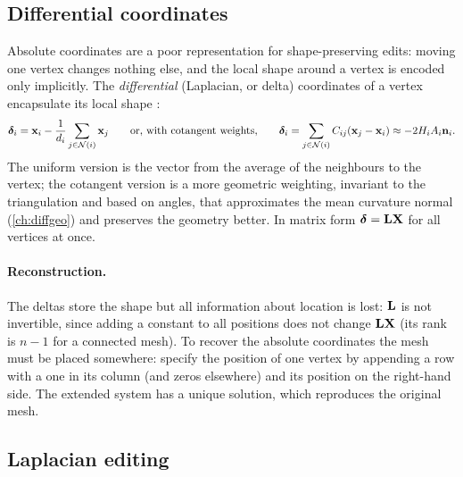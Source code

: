 \subsection{Differential coordinates}

Absolute coordinates are a poor representation for shape-preserving edits: moving one vertex
changes nothing else, and the local shape around a vertex is encoded only implicitly. The
\emph{differential} (Laplacian, or delta) coordinates of a vertex encapsulate its local shape
\citep{Sorkine2006}:
\begin{equation}
\boldsymbol{\delta}_i=\mathbf{x}_i-\frac{1}{d_i}\sum_{j\in\mathcal N(i)}\mathbf{x}_j
\qquad\text{or, with cotangent weights,}\qquad
\boldsymbol{\delta}_i=\sum_{j\in\mathcal N(i)}C_{ij}(\mathbf{x}_j-\mathbf{x}_i)\approx-2H_iA_i\mathbf{n}_i .
\end{equation}
The uniform version is the vector from the average of the neighbours to the vertex; the cotangent
version is a more geometric weighting, invariant to the triangulation and based on angles, that
approximates the mean curvature normal (\cref{ch:diffgeo}) and preserves the geometry better. In
matrix form $\boldsymbol{\delta}=\mathbf{L}\mathbf{X}$ for all vertices at once.

\paragraph{Reconstruction.} The deltas store the shape but all information about location is lost:
$\mathbf{L}$ is not invertible, since adding a constant to all positions does not change $\mathbf{L}\mathbf{X}$ (its
rank is $n-1$ for a connected mesh). To recover the absolute coordinates the mesh must be placed
somewhere: specify the position of one vertex by appending a row with a one in its column (and
zeros elsewhere) and its position on the right-hand side. The extended system has a unique
solution, which reproduces the original mesh.

\subsection{Laplacian editing}

